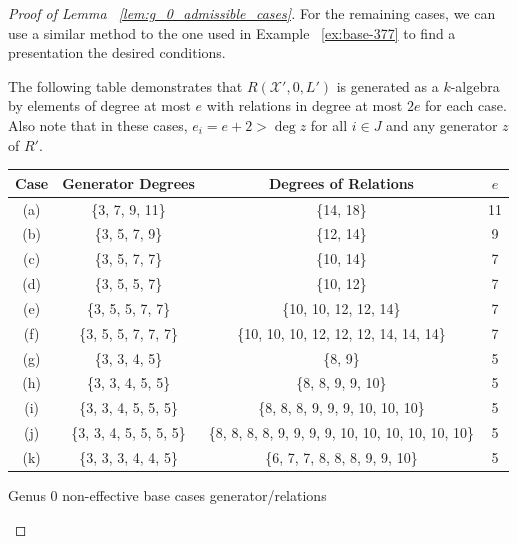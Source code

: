 \documentclass{amsart}
\theoremstyle{plain}
\theoremstyle{definition}
\theoremstyle{remark}
\numberwithin{equation}{section}
\newcommand \sx{\mathscr X}
\begin{document}
\begin{proof}[Proof of Lemma ~\ref{lem:g_0_admissible_cases}]
For the remaining cases, we can use a similar method to the one
used in Example ~\ref{ex:base-377} to find a presentation the
desired conditions.

The following table demonstrates that $R(\sx', 0, L')$ is
generated as a $k$-algebra by elements of degree at most $e$
with relations in degree at most $2e$ for each case. Also note
that in these cases, $e_i = e + 2 > \deg z$ for all $i \in J$
and any generator $z$ of $R'$.
\begin{longtable}
	{| c || c | c | c |}
	\hline
	Case & Generator Degrees & Degrees of Relations & $e$\\
	\hline
	\hline

	(a) & \{3, 7, 9, 11\} & \{14, 18\} & 11\\	\hline

	(b) & \{3, 5, 7, 9\} & \{12, 14\}	& 9\\ \hline

	(c) & \{3, 5, 7, 7\} & \{10, 14\}	& 7\\ \hline
	
	(d) & \{3, 5, 5, 7\} & \{10, 12\}	& 7\\ \hline
	
	(e) & \{3, 5, 5, 7, 7\} & \{10, 10, 12, 12, 14\}	& 7\\ \hline
	
	(f) & \{3, 5, 5, 7, 7, 7\} & \{10, 10, 10, 12, 12, 12, 14, 14, 14\}	& 7\\ \hline

	(g) & \{3, 3, 4, 5\} & \{8, 9\} & 5\\ \hline
	
	(h) & \{3, 3, 4, 5, 5\} & \{8, 8, 9, 9, 10\} & 5\\ \hline
	
	(i) & \{3, 3, 4, 5, 5, 5\} &
	\{8, 8, 8, 9, 9, 9, 10, 10, 10\} & 5\\ \hline
	
	(j) & \{3, 3, 4, 5, 5, 5, 5\} &
	\{8, 8, 8, 8, 9, 9, 9, 9, 10, 10, 10, 10, 10, 10\} & 5\\ \hline

	(k) &	\{3, 3, 3, 4,	4, 5\} & \{6, 7, 7, 8, 8, 8, 9, 9, 10\} & 5\\ \hline
\end{longtable}

\begin{center}
Genus 0 non-effective base cases generator/relations
\end{center}


\end{proof}
\end{document}
